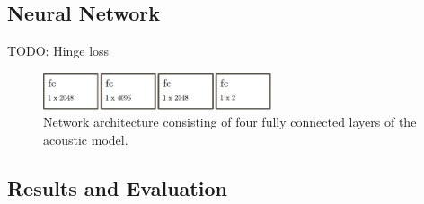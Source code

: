 \subsection{Neural Network}

TODO: Hinge loss

\begin{figure}[ht]
    \centering
    \includegraphics[width=0.6\textwidth]{img/net_acoustic.pdf}
    \caption{Network architecture consisting of four fully connected layers of the acoustic model.}
    \label{fig:net_acoustic}
\end{figure}


\subsection{Results and Evaluation}

